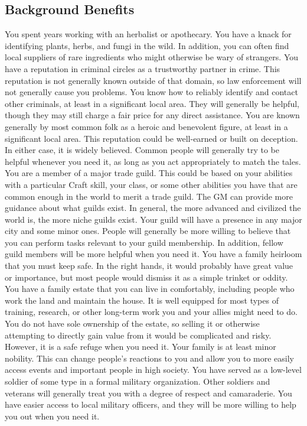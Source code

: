   \subsection{Background Benefits}
     You spent years working with an herbalist or apothecary.
    You have a knack for identifying plants, herbs, and fungi in the wild.
    In addition, you can often find local suppliers of rare ingredients who might otherwise be wary of strangers.
     You have a reputation in criminal circles as a trustworthy partner in crime.
    This reputation is not generally known outside of that domain, so law enforcement will not generally cause you problems.
    You know how to reliably identify and contact other criminals, at least in a significant local area.
    They will generally be helpful, though they may still charge a fair price for any direct assistance.
     You are known generally by most common folk as a heroic and benevolent figure, at least in a significant local area.
    This reputation could be well-earned or built on deception.
    In either case, it is widely believed.
    Common people will generally try to be helpful whenever you need it, as long as you act appropriately to match the tales.
     You are a member of a major trade guild.
    This could be based on your abilities with a particular Craft skill, your class, or some other abilities you have that are common enough in the world to merit a trade guild.
    The GM can provide more guidance about what guilds exist.
    In general, the more advanced and civilized the world is, the more niche guilds exist.
    Your guild will have a presence in any major city and some minor ones.
    People will generally be more willing to believe that you can perform tasks relevant to your guild membership.
    In addition, fellow guild members will be more helpful when you need it.
     You have a family heirloom that you must keep safe.
    In the right hands, it would probably have great value or importance, but most people would dismiss it as a simple trinket or oddity.
     You have a family estate that you can live in comfortably, including people who work the land and maintain the house.
    It is well equipped for most types of training, research, or other long-term work you and your allies might need to do.
    You do not have sole ownership of the estate, so selling it or otherwise attempting to directly gain value from it would be complicated and risky.
    However, it is a safe refuge when you need it.
     Your family is at least minor nobility.
    This can change people's reactions to you and allow you to more easily access events and important people in high society.
     You have served as a low-level soldier of some type in a formal military organization.
    Other soldiers and veterans will generally treat you with a degree of respect and camaraderie.
    You have easier access to local military officers, and they will be more willing to help you out when you need it.

